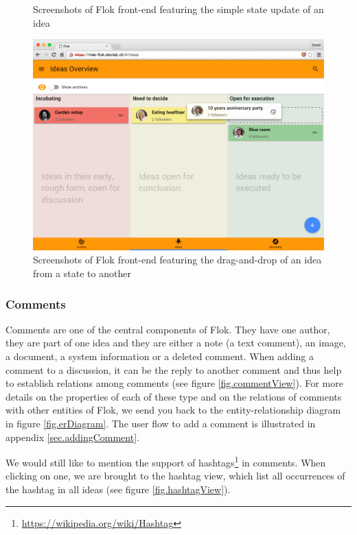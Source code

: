 \documentclass[a4paper,12pt,twoside]{article}
\begin{document}
\begin{figure}[!htb]
\begin{subfigure}{.48\textwidth}
    \end{subfigure}
    \caption{Screenshots of Flok front-end featuring the simple state update of an idea}
    \label{fig.stateSelect}
\end{figure}

\begin{figure}[!htb]
    \centering
    \includegraphics[width=\textwidth]{images/stateDragAndDrop.png}
    \caption{Screenshots of Flok front-end featuring the drag-and-drop of an idea from a state to another}
    \label{fig.stateDragAndDrop}
\end{figure}

\FloatBarrier
\subsubsection{Comments}
\label{sec.comments}
Comments are one of the central components of Flok.
They have one author, they are part of one idea and they are either a note (a text comment), an image, a document, a system information or a deleted comment.
When adding a comment to a discussion, it can be the reply to another comment and thus help to establish relations among comments (see figure \ref{fig.commentView}).
For more details on the properties of each of these type and on the relations of comments with other entities of Flok, we send you back to the entity-relationship diagram in figure \ref{fig.erDiagram}.
The user flow to add a comment is illustrated in appendix \ref{sec.addingComment}.

We would still like to mention the support of hashtags\footnote{\url{https://wikipedia.org/wiki/Hashtag}} in comments.
When clicking on one, we are brought to the hashtag view, which list all occurrences of the hashtag in all ideas (see figure \ref{fig.hashtagView}).
\end{document}
